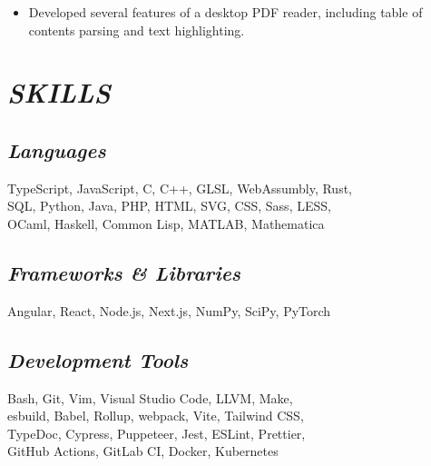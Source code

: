 \documentclass[11pt]{article}
\begin{document}
\begin{minipage}{270pt}
\begin{itemize}
\item Developed several features of a desktop PDF reader, including table of contents parsing and text highlighting.
\end{itemize}

\section*{\it SKILLS}
\subsection*{\it Languages}
TypeScript, JavaScript, C, C++, GLSL, WebAssumbly, Rust,\\
SQL, Python, Java, PHP, HTML, SVG, CSS, Sass, LESS,\\
OCaml, Haskell, Common Lisp, MATLAB, Mathematica

\subsection*{\it Frameworks \& Libraries}
Angular, React, Node.js, Next.js, NumPy, SciPy, PyTorch

\subsection*{\it Development Tools}
Bash, Git, Vim, Visual Studio Code, LLVM, Make,\\
esbuild, Babel, Rollup, webpack, Vite, Tailwind CSS,\\
TypeDoc, Cypress, Puppeteer, Jest, ESLint, Prettier,\\
GitHub Actions, GitLab CI, Docker, Kubernetes

\end{minipage}
\end{document}
